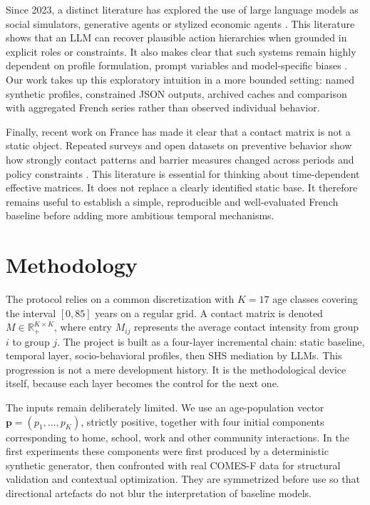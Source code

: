 \documentclass[ROIA,Unicode]{cedram}
\begin{document}
Since 2023, a distinct literature has explored the use of large language models as social simulators, generative agents or stylized economic agents \citep{park2023generative,argyle2023out,horton2023homo}. This literature shows that an LLM can recover plausible action hierarchies when grounded in explicit roles or constraints. It also makes clear that such systems remain highly dependent on profile formulation, prompt variables and model-specific biases \citep{weidinger2022taxonomy,bender2021stochastic}. Our work takes up this exploratory intuition in a more bounded setting: named synthetic profiles, constrained JSON outputs, archived caches and comparison with aggregated French series rather than observed individual behavior.

Finally, recent work on France has made it clear that a contact matrix is not a static object. Repeated surveys and open datasets on preventive behavior show how strongly contact patterns and barrier measures changed across periods and policy constraints \citep{soussand2025socialcov,socialcov2024,coviprev2021}. This literature is essential for thinking about time-dependent effective matrices. It does not replace a clearly identified static base. It therefore remains useful to establish a simple, reproducible and well-evaluated French baseline before adding more ambitious temporal mechanisms.

\section{Methodology}
The protocol relies on a common discretization with $K=17$ age classes covering the interval $[0,85]$ years on a regular grid. A contact matrix is denoted $M \in \mathbb{R}_{+}^{K\times K}$, where entry $M_{ij}$ represents the average contact intensity from group $i$ to group $j$. The project is built as a four-layer incremental chain: static baseline, temporal layer, socio-behavioral profiles, then SHS mediation by LLMs. This progression is not a mere development history. It is the methodological device itself, because each layer becomes the control for the next one.

The inputs remain deliberately limited. We use an age-population vector $\mathbf{p}=(p_1,\dots,p_K)$, strictly positive, together with four initial components corresponding to home, school, work and other community interactions. In the first experiments these components were first produced by a deterministic synthetic generator, then confronted with real COMES-F data for structural validation and contextual optimization. They are symmetrized before use so that directional artefacts do not blur the interpretation of baseline models.
\end{document}
